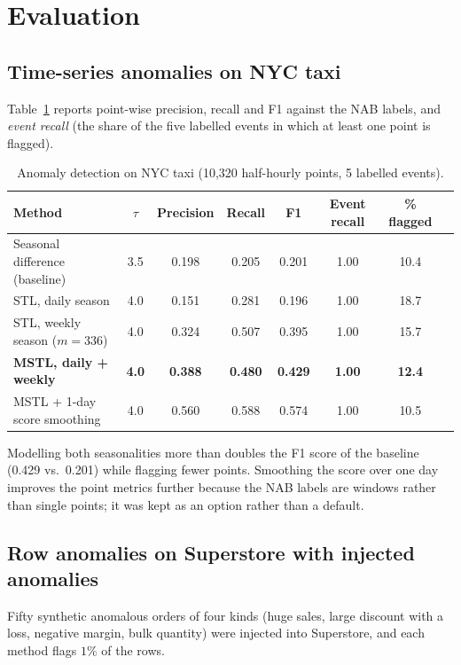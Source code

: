\documentclass[11pt,a4paper]{article}
\begin{document}
\section{Evaluation}

\subsection{Time-series anomalies on NYC taxi}
Table~\ref{tab:taxi} reports point-wise precision, recall and F1 against the NAB labels, and \emph{event recall}
(the share of the five labelled events in which at least one point is flagged).

\begin{table}[H]
\centering\small
\begin{tabular}{@{}lccccccc@{}}
\toprule
Method & $\tau$ & Precision & Recall & F1 & Event recall & \% flagged \\
\midrule
Seasonal difference (baseline) & 3.5 & 0.198 & 0.205 & 0.201 & 1.00 & 10.4 \\
STL, daily season              & 4.0 & 0.151 & 0.281 & 0.196 & 1.00 & 18.7 \\
STL, weekly season ($m=336$)   & 4.0 & 0.324 & 0.507 & 0.395 & 1.00 & 15.7 \\
\textbf{MSTL, daily + weekly}  & \textbf{4.0} & \textbf{0.388} & \textbf{0.480} & \textbf{0.429} & \textbf{1.00} & \textbf{12.4} \\
MSTL + 1-day score smoothing   & 4.0 & 0.560 & 0.588 & 0.574 & 1.00 & 10.5 \\
\bottomrule
\end{tabular}
\caption{Anomaly detection on NYC taxi (10{,}320 half-hourly points, 5 labelled events).}
\label{tab:taxi}
\end{table}

\noindent
Modelling both seasonalities more than doubles the F1 score of the baseline (0.429 vs.\ 0.201) while flagging
fewer points. Smoothing the score over one day improves the point metrics further because the NAB labels are
windows rather than single points; it was kept as an option rather than a default.

\subsection{Row anomalies on Superstore with injected anomalies}
Fifty synthetic anomalous orders of four kinds (huge sales, large discount with a loss, negative margin, bulk
quantity) were injected into Superstore, and each method flags $1\%$ of the rows.
\end{document}
